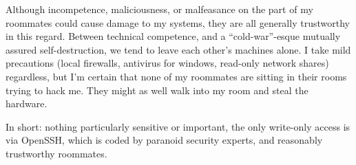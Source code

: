 \documentclass[11pt]{article}
\begin{document}
Although incompetence, maliciousness, or malfeasance on the part of my 
roommates could cause damage to my systems, they are all generally trustworthy
in this regard.  Between technical competence, and a ``cold-war''\--esque 
mutually assured self-destruction, we tend to leave each other's machines 
alone.  I take mild precautions (local firewalls, antivirus for windows,
read\--only network shares) regardless, but I'm certain that none of my 
roommates are sitting in their rooms trying to hack me.  They might as well
walk into my room and steal the hardware.

In short: nothing particularly sensitive or important,
the only write-only access is via OpenSSH, which is coded by paranoid 
security experts, and reasonably trustworthy roommates.
\end{document}
